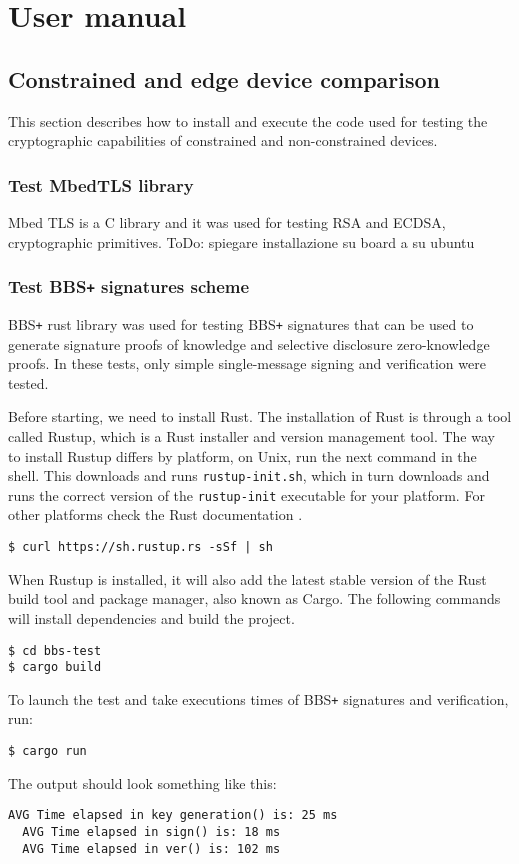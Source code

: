 
\section{User manual}
\subsection{Constrained and edge device comparison}
This section describes how to install and execute the code used for testing the cryptographic capabilities of constrained and non-constrained devices.  
\subsubsection{Test MbedTLS library}
Mbed TLS \cite{mbed-tls} is a C library and it was used for testing RSA and ECDSA, cryptographic primitives. 
{\color{red} ToDo: spiegare installazione su board a su ubuntu}
\subsubsection{Test BBS\texttt{+} signatures scheme}
BBS\texttt{+} rust library was used for testing BBS\texttt{+} signatures that can be used to generate signature proofs of knowledge and selective disclosure zero-knowledge proofs. In these tests, only simple single-message signing and verification were tested.

Before starting, we need to install Rust. The installation of Rust is through a tool called Rustup, which is a Rust installer and version management tool. The way to install Rustup differs by platform, on Unix, run the next command in the shell. This downloads and runs \texttt{rustup-init.sh}, which in turn downloads and runs the correct version of the \texttt{rustup-init} executable for your platform. For other platforms check the Rust documentation \cite{rust-install}. 
\begin{lstlisting}[frame=single]
$ curl https://sh.rustup.rs -sSf | sh
\end{lstlisting}
When Rustup is installed, it will also add the latest stable version of the Rust build tool and package manager, also known as Cargo. The following commands will install dependencies and build the project. 
\begin{lstlisting}[frame=single]
$ cd bbs-test
$ cargo build
\end{lstlisting}
To launch the test and take executions times of BBS\texttt{+} signatures and verification, run:  
\begin{lstlisting}[frame=single]
$ cargo run
\end{lstlisting}
The output should look something like this:
\begin{lstlisting}[style=DOS,frame=single]
  AVG Time elapsed in key generation() is: 25 ms
  AVG Time elapsed in sign() is: 18 ms
  AVG Time elapsed in ver() is: 102 ms
\end{lstlisting}

